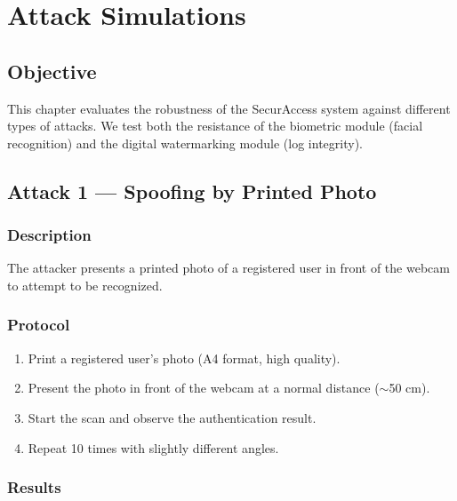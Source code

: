 \chapter{Attack Simulations}

\section{Objective}

This chapter evaluates the robustness of the SecurAccess system against different types of attacks. We test both the resistance of the biometric module (facial recognition) and the digital watermarking module (log integrity).

\section{Attack 1 — Spoofing by Printed Photo}

\subsection{Description}

The attacker presents a printed photo of a registered user in front of the webcam to attempt to be recognized.

\subsection{Protocol}

\begin{enumerate}
    \item Print a registered user's photo (A4 format, high quality).
    \item Present the photo in front of the webcam at a normal distance ($\sim$50 cm).
    \item Start the scan and observe the authentication result.
    \item Repeat 10 times with slightly different angles.
\end{enumerate}

\subsection{Results}

